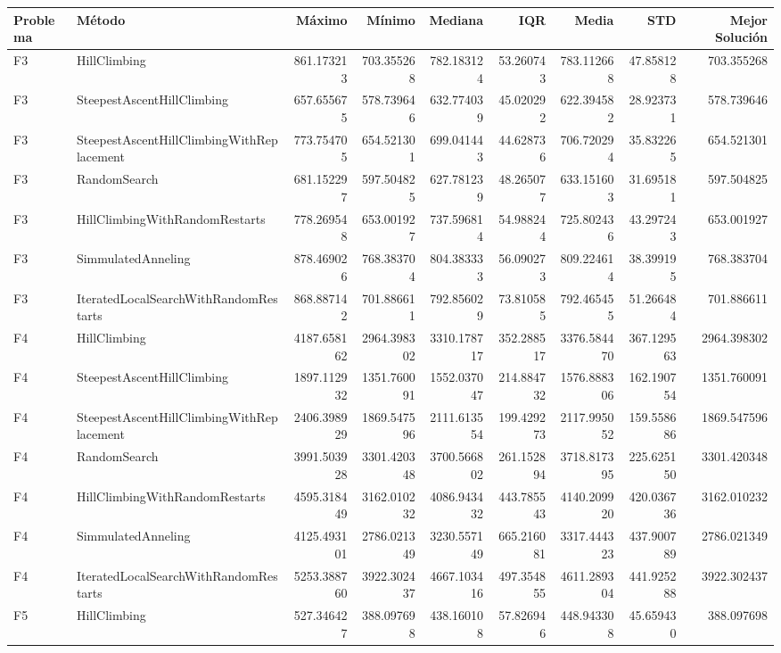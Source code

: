 \begin{tabular}{llrrrrrrr}
\toprule
Problema & Método & Máximo & Mínimo & Mediana & IQR & Media & STD & Mejor Solución \\
\midrule
F3 & HillClimbing & 861.173213 & 703.355268 & 782.183124 & 53.260743 & 783.112668 & 47.858128 & 703.355268 \\
F3 & SteepestAscentHillClimbing & 657.655675 & 578.739646 & 632.774039 & 45.020292 & 622.394582 & 28.923731 & 578.739646 \\
F3 & SteepestAscentHillClimbingWithReplacement & 773.754705 & 654.521301 & 699.041443 & 44.628736 & 706.720294 & 35.832265 & 654.521301 \\
F3 & RandomSearch & 681.152297 & 597.504825 & 627.781239 & 48.265077 & 633.151603 & 31.695181 & 597.504825 \\
F3 & HillClimbingWithRandomRestarts & 778.269548 & 653.001927 & 737.596814 & 54.988244 & 725.802436 & 43.297243 & 653.001927 \\
F3 & SimmulatedAnneling & 878.469026 & 768.383704 & 804.383333 & 56.090273 & 809.224614 & 38.399195 & 768.383704 \\
F3 & IteratedLocalSearchWithRandomRestarts & 868.887142 & 701.886611 & 792.856029 & 73.810585 & 792.465455 & 51.266484 & 701.886611 \\
F4 & HillClimbing & 4187.658162 & 2964.398302 & 3310.178717 & 352.288517 & 3376.584470 & 367.129563 & 2964.398302 \\
F4 & SteepestAscentHillClimbing & 1897.112932 & 1351.760091 & 1552.037047 & 214.884732 & 1576.888306 & 162.190754 & 1351.760091 \\
F4 & SteepestAscentHillClimbingWithReplacement & 2406.398929 & 1869.547596 & 2111.613554 & 199.429273 & 2117.995052 & 159.558686 & 1869.547596 \\
F4 & RandomSearch & 3991.503928 & 3301.420348 & 3700.566802 & 261.152894 & 3718.817395 & 225.625150 & 3301.420348 \\
F4 & HillClimbingWithRandomRestarts & 4595.318449 & 3162.010232 & 4086.943432 & 443.785543 & 4140.209920 & 420.036736 & 3162.010232 \\
F4 & SimmulatedAnneling & 4125.493101 & 2786.021349 & 3230.557149 & 665.216081 & 3317.444323 & 437.900789 & 2786.021349 \\
F4 & IteratedLocalSearchWithRandomRestarts & 5253.388760 & 3922.302437 & 4667.103416 & 497.354855 & 4611.289304 & 441.925288 & 3922.302437 \\
F5 & HillClimbing & 527.346427 & 388.097698 & 438.160108 & 57.826946 & 448.943308 & 45.659430 & 388.097698 \\

\end{tabular}
